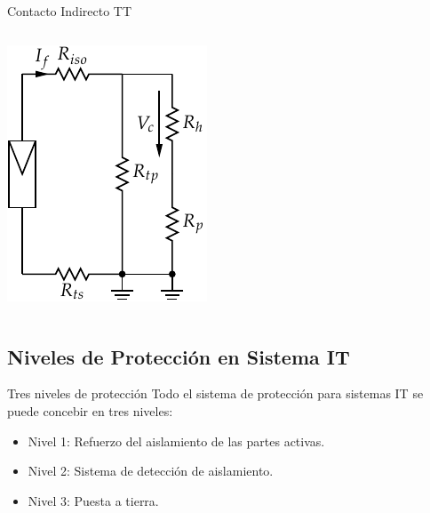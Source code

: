 \documentclass[xcolor={usenames,svgnames,dvipsnames}]{beamer}
\begin{document}
\begin{frame}[label={sec:org0965e01}]{Contacto Indirecto TT}
\begin{columns}
\begin{column}{0.5\columnwidth}
\begin{center}
\includegraphics[width=\textwidth]{../figs/ContactoIndirectoTT_simple.pdf}
\end{center}
\end{column}
\end{columns}
\end{frame}


\subsection{Niveles de Protección en Sistema IT}
\label{sec:org54e8855}


\begin{frame}[label={sec:orgc6e8e40}]{Tres niveles de protección}
Todo el sistema de protección para sistemas IT se puede concebir en tres
niveles:

\begin{itemize}
\item Nivel 1: Refuerzo del aislamiento de las partes activas.

\item Nivel 2: Sistema de detección de aislamiento.

\item Nivel 3: Puesta a tierra.
\end{itemize}
\end{frame}
\end{document}
